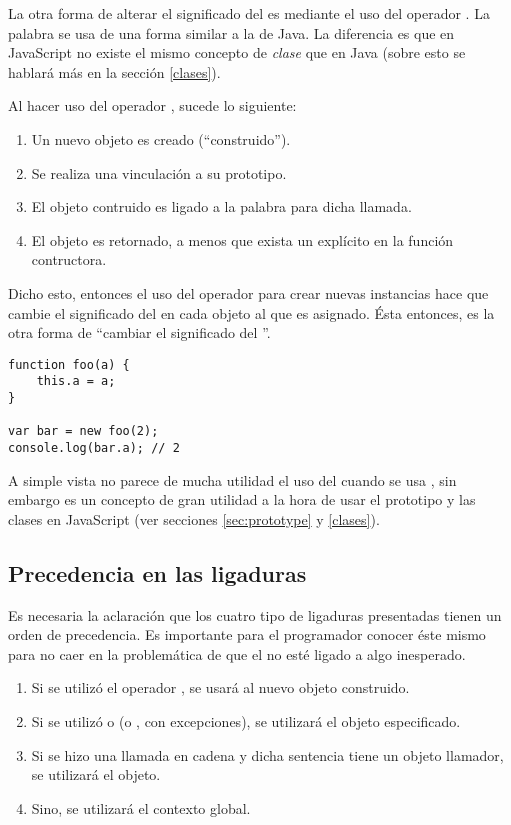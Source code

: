 La otra forma de alterar el significado del  es mediante el uso del operador . La palabra  se usa de una forma similar a la de Java. La diferencia es que en JavaScript no existe el mismo concepto de \textit{clase} que en Java (sobre esto se hablará más en la sección \ref{clases}).

Al hacer uso del operador , sucede lo siguiente:

\begin{enumerate}
\item Un nuevo objeto es creado ("`construido"').
\item Se realiza una vinculación a su prototipo.
\item El objeto contruido es ligado a la palabra  para dicha llamada.
\item El objeto es retornado, a menos que exista un  explícito en la función contructora.
\end{enumerate}

Dicho esto, entonces el uso del operador  para crear nuevas instancias hace que cambie el significado del  en cada objeto al que es asignado. Ésta entonces, es la otra forma de "`cambiar el significado del "'.

\begin{lstlisting}[title={Ligadura mediante \code{new}}]
function foo(a) {
	this.a = a;
}

var bar = new foo(2);
console.log(bar.a); // 2
\end{lstlisting}

A simple vista no parece de mucha utilidad el uso del  cuando se usa , sin embargo es un concepto de gran utilidad a la hora de usar el prototipo y las clases en JavaScript (ver secciones \ref{sec:prototype} y \ref{clases}).

\subsection{Precedencia en las ligaduras}

Es necesaria la aclaración que los cuatro tipo de ligaduras presentadas tienen un orden de precedencia. Es importante para el programador conocer éste mismo para no caer en la problemática de que el  no esté ligado a algo inesperado.

\begin{enumerate}
\item Si se utilizó el operador , se usará al nuevo objeto construido.
\item Si se utilizó  o  (o , con excepciones), se utilizará el objeto especificado.
\item Si se hizo una llamada en cadena y dicha sentencia tiene un objeto llamador, se utilizará el objeto.
\item Sino, se utilizará el contexto global.
\end{enumerate}

